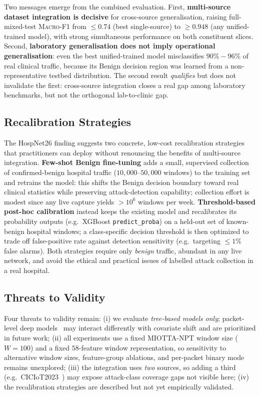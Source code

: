 \documentclass[runningheads]{llncs}
\newcommand{\macroF}{\textsc{Macro-F1}}
\begin{document}
Two messages emerge from the combined evaluation. First, \textbf{multi-source dataset integration is decisive} for cross-source generalisation, raising full-mixed-test \macroF{} from $\leq 0.74$ (best single-source) to $\geq 0.948$ (any unified-trained model), with strong simultaneous performance on both constituent slices. Second, \textbf{laboratory generalisation does not imply operational generalisation}: even the best unified-trained model misclassifies $90\%\!-\!96\%$ of real clinical traffic, because its Benign decision region was learned from a non-representative testbed distribution. The second result \emph{qualifies} but does not invalidate the first: cross-source integration closes a real gap among laboratory benchmarks, but not the orthogonal lab-to-clinic gap.

\subsection{Recalibration Strategies}

The HospNet26 finding suggests two concrete, low-cost recalibration strategies that practitioners can deploy without renouncing the benefits of multi-source integration. \textbf{Few-shot Benign fine-tuning} adds a small, supervised collection of confirmed-benign hospital traffic ($10{,}000$--$50{,}000$ windows) to the training set and retrains the model: this shifts the Benign decision boundary toward real clinical statistics while preserving attack-detection capability; collection effort is modest since any live capture yields $>\!10^{6}$ windows per week. \textbf{Threshold-based post-hoc calibration} instead keeps the existing model and recalibrates its probability outputs (e.g.\ XGBoost \texttt{predict\_proba}) on a held-out set of known-benign hospital windows; a class-specific decision threshold is then optimized to trade off false-positive rate against detection sensitivity (e.g.\ targeting $\leq 1\%$ false alarms). Both strategies require only \emph{benign} traffic, abundant in any live network, and avoid the ethical and practical issues of labelled attack collection in a real hospital.

\subsection{Threats to Validity}

Four threats to validity remain: (i) we evaluate \emph{tree-based models only}; packet-level deep models~\cite{holland2021nprint} may interact differently with covariate shift and are prioritized in future work; (ii) all experiments use a fixed MIOTTA-NPT window size ($W{=}100$) and a fixed $58$-feature window representation, so sensitivity to alternative window sizes, feature-group ablations, and per-packet binary mode remains unexplored; (iii) the integration uses \emph{two} sources, so adding a third (e.g.\ CICIoT2023~\cite{neto2023ciciot2023}) may expose attack-class coverage gaps not visible here; (iv) the recalibration strategies are described but not yet empirically validated.
\end{document}
